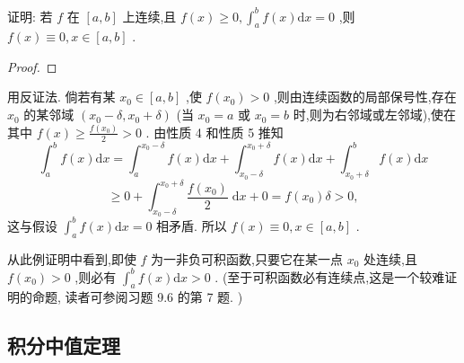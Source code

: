 \begin{example}

\end{example}
证明: 若 \(f\) 在 \(\left\lbrack  {a,b}\right\rbrack\) 上连续,且 \(f\left( x\right)  \geq  0,{\int }_{a}^{b}f\left( x\right) \mathrm{d}x = 0\) ,则 \(f\left( x\right)  \equiv  0,x \in  \left\lbrack  {a,b}\right\rbrack\) .

\begin{proof}

\end{proof}
用反证法. 倘若有某 \({x}_{0} \in  \left\lbrack  {a,b}\right\rbrack\) ,使 \(f\left( {x}_{0}\right)  > 0\) ,则由连续函数的局部保号性,存在 \({x}_{0}\) 的某邻域 \(\left( {{x}_{0} - \delta ,{x}_{0} + \delta }\right)\) (当 \({x}_{0} = a\) 或 \({x}_{0} = b\) 时,则为右邻域或左邻域),使在其中 \(f\left( x\right)  \geq  \frac{f\left( {x}_{0}\right) }{2} > 0\) . 由性质 4 和性质 5 推知
\[
{\int }_{a}^{b}f\left( x\right) \mathrm{d}x = {\int }_{a}^{{x}_{0} - \delta }f\left( x\right) \mathrm{d}x + {\int }_{{x}_{0} - \delta }^{{x}_{0} + \delta }f\left( x\right) \mathrm{d}x + {\int }_{{x}_{0} + \delta }^{b}f\left( x\right) \mathrm{d}x
\]
\[
\geq  0 + {\int }_{{x}_{0} - \delta }^{{x}_{0} + \delta }\frac{f\left( {x}_{0}\right) }{2}\mathrm{\;d}x + 0 = f\left( {x}_{0}\right) \delta  > 0,
\]
这与假设 \({\int }_{a}^{b}f\left( x\right) \mathrm{d}x = 0\) 相矛盾. 所以 \(f\left( x\right)  \equiv  0,x \in  \left\lbrack  {a,b}\right\rbrack\) .

\begin{remark}

\end{remark}
从此例证明中看到,即使 \(f\) 为一非负可积函数,只要它在某一点 \({x}_{0}\) 处连续,且 \(f\left( {x}_{0}\right)  > 0\) ,则必有 \({\int }_{a}^{b}f\left( x\right) \mathrm{d}x > 0\) . (至于可积函数必有连续点,这是一个较难证明的命题, 读者可参阅习题 9.6 的第 7 题. )

\subsection{积分中值定理}

